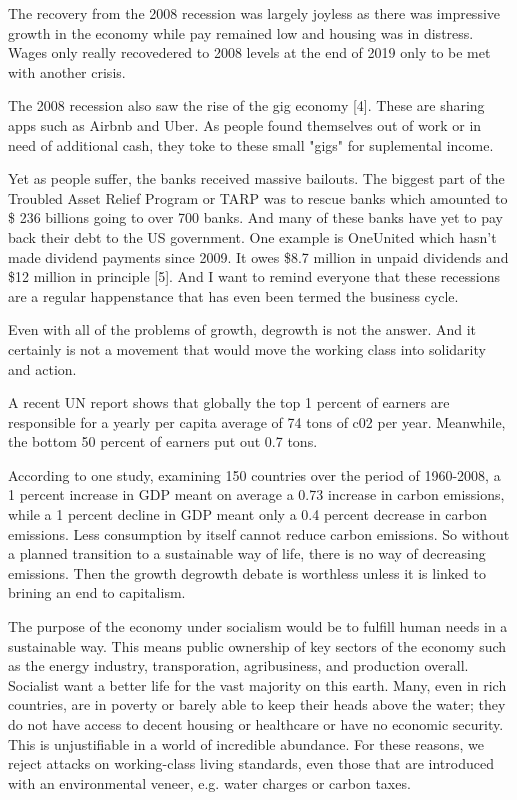 \documentclass{article}
\begin{document}
The recovery from the 2008 recession was largely joyless as there was impressive growth in the economy while pay remained low and housing was in distress. Wages only really recovedered to 2008 levels at the end of 2019 only to be met with another crisis.

The 2008 recession also saw the rise of the gig economy [4]. These are sharing apps such as Airbnb and Uber. As people found themselves out of work or in need of additional cash, they toke to these small "gigs" for suplemental income.

Yet as people suffer, the banks received massive bailouts. The biggest part of the Troubled Asset Relief Program or TARP was to rescue banks which amounted to \$ 236 billions going to over 700 banks. And many of these banks have yet to pay back their debt to the US government. One example is OneUnited which hasn't made dividend payments since 2009. It owes \$8.7 million in unpaid dividends and \$12 million in principle [5]. And I want to remind everyone that these recessions are a regular happenstance that has even been termed the business cycle.

Even with all of the problems of growth, degrowth is not the answer. And it certainly is not a movement that would move the working class into solidarity and action.

A recent UN report shows that globally the top 1 percent of earners are responsible for a yearly per capita average of 74 tons of c02 per year. Meanwhile, the bottom 50 percent of earners put out 0.7 tons.

According to one study, examining 150 countries over the period of 1960-2008, a 1 percent increase in GDP meant on average a 0.73 increase in carbon emissions, while a 1 percent decline in GDP meant only a 0.4 percent decrease in carbon emissions. Less consumption by itself cannot reduce carbon emissions. So without a planned transition to a sustainable way of life, there is no way of decreasing emissions. Then the growth degrowth debate is worthless unless it is linked to brining an end to capitalism.

The purpose of the economy under socialism would be to fulfill human needs in a sustainable way. This means public ownership of key sectors of the economy such as the energy industry, transporation, agribusiness, and production overall. Socialist want a better life for the vast majority on this earth. Many, even in rich countries, are in poverty or barely able to keep their heads above the water; they do not have access to decent housing or healthcare or have no economic security. This is unjustifiable in a world of incredible abundance. For these reasons, we reject attacks on working-class living standards, even those that are introduced with an environmental veneer, e.g. water charges or carbon taxes.
\end{document}
